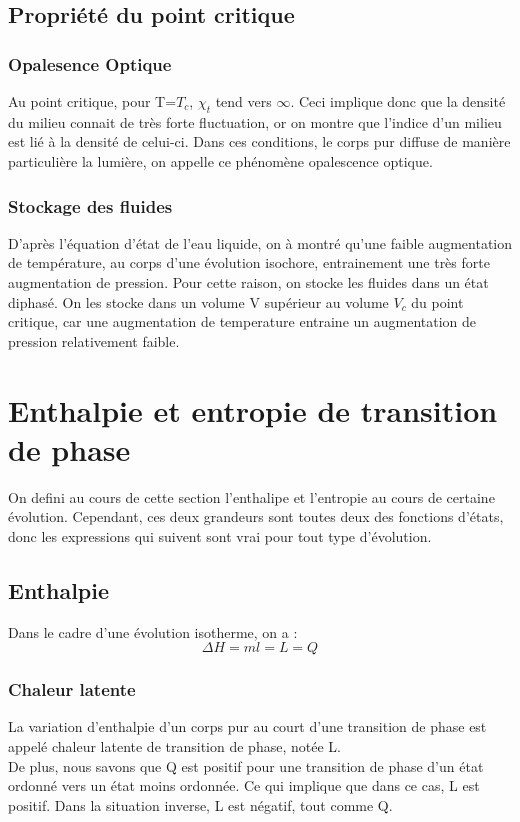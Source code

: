 \subsection{Propriété du point critique}
\subsubsection{Opalesence Optique}
Au point critique, pour T=$T_c$, $\chi_t$ tend vers $\infty$. Ceci implique donc que la densité du milieu connait de très forte fluctuation, or on montre que l'indice d'un milieu est lié à la densité de celui-ci. Dans ces conditions, le corps pur diffuse de manière particulière la lumière, on appelle ce phénomène opalescence optique.
\subsubsection{Stockage des fluides}
D'après l'équation d'état de l'eau liquide, on à montré qu'une faible augmentation de température, au corps d'une évolution isochore, entrainement une très forte augmentation de pression. Pour cette raison, on stocke les fluides dans un état diphasé. On les stocke dans un volume V supérieur au volume $V_c$ du point critique, car une augmentation de temperature entraine un augmentation de pression relativement faible.
\section{Enthalpie et entropie de transition de phase}
On defini au cours de cette section l'enthalipe et l'entropie au cours de certaine évolution. Cependant, ces deux grandeurs sont toutes deux des fonctions d'états, donc les expressions qui suivent sont vrai pour tout type d'évolution.
\subsection{Enthalpie}
\begin{de}
Dans le cadre d'une évolution isotherme, on a : 
$$\Delta H = ml = L = Q$$
\end{de}
\subsubsection{Chaleur latente}
\begin{de}
 La variation d'enthalpie d'un corps pur au court d'une transition de phase est appelé chaleur latente de transition de phase, notée L.\\
De plus, nous savons que Q est positif pour une transition de phase d'un état ordonné vers un état moins ordonnée. Ce qui implique que dans ce cas, L est positif. Dans la situation inverse, L est négatif, tout comme Q. 
\end{de}

